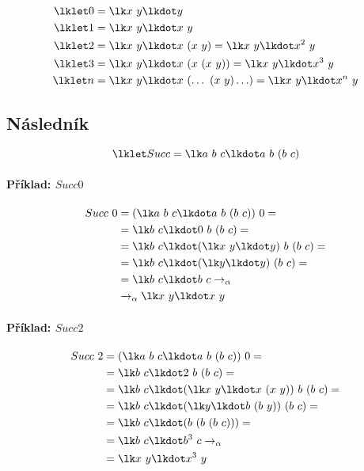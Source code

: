 \begin{equation}
    \begin{split}
        \lklet 0 &= \lk x ~ y \lkdot y \\
        \lklet 1 &= \lk x ~ y \lkdot x ~ y \\
        \lklet 2 &= \lk x ~ y \lkdot x ~ (x ~ y) = \lk x ~ y \lkdot x^2 ~ y \\
        \lklet 3 &= \lk x ~ y \lkdot x ~ (x ~ (x ~ y)) = \lk x ~ y \lkdot x^3 ~ y \\
        \lklet n &= \lk x ~ y \lkdot x ~ (\ldots ~ (x ~ y) \ldots ) = \lk x ~ y \lkdot x^n ~ y
    \end{split}
\end{equation}

\subsection{Následník}

$$ \lklet Succ = \lk a ~ b ~ c \lkdot a ~ b ~ (b ~ c) $$

\paragraph*{Příklad: $Succ 0$}
\begin{equation}
    \begin{split}
        Succ ~ 0 &= (\lk a ~ b ~ c \lkdot a ~ b ~ (b ~ c)) ~ 0 = \\
        &= \lk b ~ c \lkdot 0 ~ b ~ (b ~ c) = \\
        &= \lk b ~ c \lkdot (\lk x ~ y \lkdot y) ~ b ~ (b ~ c) = \\
        &= \lk b ~ c \lkdot (\lk y \lkdot y) ~ (b ~ c) = \\
        &= \lk b ~ c \lkdot b ~ c \rightarrow_{\alpha} \\
        &\rightarrow_{\alpha} \lk x ~ y \lkdot x ~ y
    \end{split}
\end{equation}

\paragraph*{Příklad: $Succ 2$}
\begin{equation}
    \begin{split}
        Succ ~ 2 &= (\lk a ~ b ~ c \lkdot a ~ b ~ (b ~ c)) ~ 0 = \\
        &= \lk b ~ c \lkdot 2 ~ b ~ (b ~ c) = \\
        &= \lk b ~ c \lkdot (\lk x ~ y \lkdot x ~ (x ~ y)) ~ b ~ (b ~ c) = \\
        &= \lk b ~ c \lkdot (\lk y \lkdot b ~ (b ~ y)) ~ (b ~ c) = \\
        &= \lk b ~ c \lkdot (b ~ (b ~ (b ~ c))) = \\
        &= \lk b ~ c \lkdot b^3 ~ c \rightarrow_{\alpha} \\
        &= \lk x ~ y \lkdot x^3 ~ y
    \end{split}
\end{equation}

